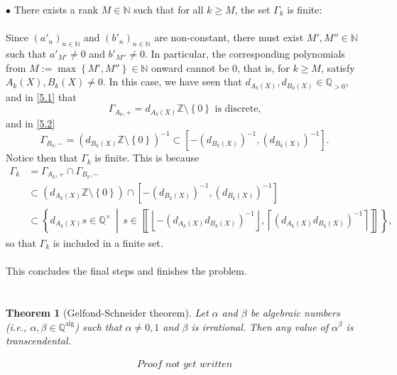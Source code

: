 \documentclass[11pt, a4paper, oneside]{article}
\newtheorem{theorem}{Theorem}
\theoremstyle{remark}
\theoremstyle{lemma}
\begin{document}
\(\bullet\) There exists a rank \( M \in \mathbb{N} \) such that for all \( k \geq M \), the set \( \Gamma_k \) is finite:
\\\\
Since \( \left( a'_n \right)_{n \in \mathbb{N}} \) and \( \left( b'_n \right)_{n \in \mathbb{N}} \) are non-constant, there must exist \( M', M'' \in \mathbb{N} \) such that \( a'_{M'} \neq 0 \) and \( b'_{M''} \neq 0 \). In particular, the corresponding polynomials from \( M := \max\left\{ M', M'' \right\} \in \mathbb{N} \) onward cannot be $0$, that is, for \( k \geq M \), satisfy \( A_k(X), B_k(X) \neq 0 \). In this case, we have seen that \( d_{A_k(X)}, d_{B_k(X)} \in \mathbb{Q}_{>0} \), and in \eqref{5.1} that
\[
\Gamma_{A_k,+} = d_{A_k(X)} \mathbb{Z} \setminus \left\{ 0 \right\} \text{ is discrete,}
\]
and in \eqref{5.2}
\[
\Gamma_{B_k,-} = \left( d_{B_k(X)} \mathbb{Z} \setminus \left\{ 0 \right\} \right)^{-1} \subset \left[ -\left( d_{B_k(X)} \right)^{-1}, \left( d_{B_k(X)} \right)^{-1} \right].
\]
Notice then that \( \Gamma_k \) is finite. This is because
\begin{align*}
\Gamma_k &= \Gamma_{A_k,+} \cap \Gamma_{B_k,-}\\ &\subset \left( d_{A_k(X)} \mathbb{Z} \setminus \left\{ 0 \right\} \right) \cap \left[ -\left( d_{B_k(X)} \right)^{-1}, \left( d_{B_k(X)} \right)^{-1} \right] \\
&\subset \left\{d_{A_k(X)} s \in \mathbb{Q}^{\times} \,\middle|\, s \in \left\llbracket \left\lfloor -\left( d_{A_k(X)} d_{B_k(X)} \right)^{-1} \right\rfloor, \left\lceil \left( d_{A_k(X)} d_{B_k(X)} \right)^{-1} \right\rceil \right\rrbracket\right\},
\end{align*}
so that \( \Gamma_k \) is included in a finite set.
\\\\
This concludes the final steps and finishes the problem.
\appendix
\section{}
\label{A}
\begin{theorem}[Gelfond-Schneider theorem]
Let \( \alpha \) and \( \beta \) be algebraic numbers (i.e., \( \alpha, \beta \in \mathbb{Q}^{\mathrm{alg}} \)) such that \( \alpha \neq 0, 1 \) and \( \beta \) is irrational. Then any value of \( \alpha^\beta \) is transcendental.
\end{theorem}
\[
\substack{\textit{Proof not yet written}}
\]

\newpage
\printbibliography
\end{document}
